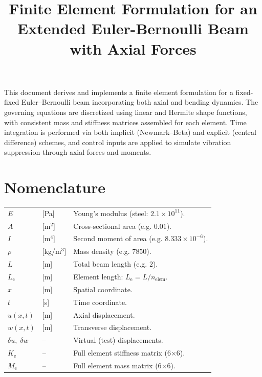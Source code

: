 \documentclass{article}
\begin{document}
	
	\title{Finite Element Formulation for an Extended Euler-Bernoulli Beam with Axial Forces}
	\author{}
	\date{}
	\maketitle
	
	This document derives and implements a finite element formulation for a fixed-fixed Euler–Bernoulli beam incorporating both axial and bending dynamics. The governing equations are discretized using linear and Hermite shape functions, with consistent mass and stiffness matrices assembled for each element. Time integration is performed via both implicit (Newmark–Beta) and explicit (central difference) schemes, and control inputs are applied to simulate vibration suppression through axial forces and moments.
	
	\section{Nomenclature}
	\begin{tabular}{@{}p{2cm}@{} p{2cm}@{} p{11cm}@{}}
		$E$           & [Pa]    & Young’s modulus (steel: $2.1\times10^{11}$).\\
		$A$           & [m$^2$] & Cross‐sectional area (e.g. $0.01$).\\
		$I$           & [m$^4$] & Second moment of area (e.g. $8.333\times10^{-6}$).\\
		$\rho$        & [kg/m$^3$]& Mass density (e.g. $7850$).\\
		$L$           & [m]     & Total beam length (e.g. $2$).\\
		$L_\mathrm{e}$         & [m]     & Element length: $L_\mathrm{e}=L/n_{\mathrm{elem}}$.\\
		$x$           & [m]     & Spatial coordinate.\\
		$t$           & [s]     & Time coordinate.\\
		$u(x,t)$      & [m]     & Axial displacement.\\
		$w(x,t)$      & [m]     & Transverse displacement.\\
		$\delta u,\;\delta w$ & – & Virtual (test) displacements.\\
		$K_\mathrm{e}$         & –       & Full element stiffness matrix (6×6).\\
		$M_\mathrm{e}$         & –       & Full element mass matrix (6×6).\\
	\end{tabular}
	
\end{document}
